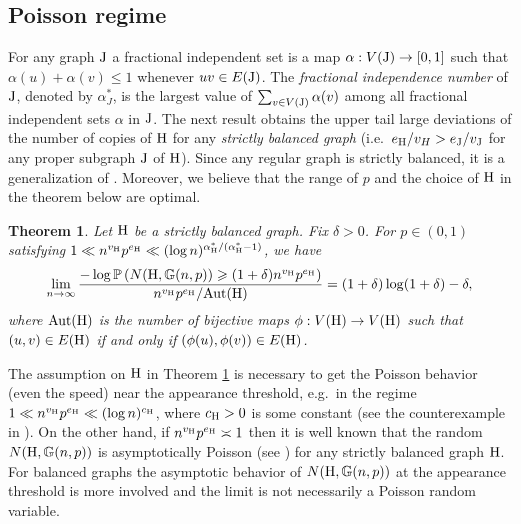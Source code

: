 \documentclass[a4paper,11pt,english,reqno]{amsart}
\numberwithin{equation}{section}
\renewcommand{\leq}{\leqslant}
\renewcommand{\geq}{\geqslant}
\newcommand{\uH}{\textup{H}}
\renewcommand{\P}{\mathbb{P}}
\newcommand{\G}{\mathbb{G}}
\newcommand{\tu}[1]{\textup{#1}}
\newtheorem{theorem}{Theorem}[section]
\begin{document}
	\subsection{Poisson regime} For any graph $\tu{J}$ %
	a fractional independent set is a map $\alpha:V(\tu{J})\rightarrow [0,1]$ such that $\alpha(u)+\alpha(v)\leq 1$ whenever $uv\in E(\tu{J})$. The {\em fractional independence number} of $\tu{J}$, denoted by $\alpha^{*}_{J}$, is the largest value of $\sum_{v\in V(\tu{J})}\alpha(v)$ among all fractional independent sets $\alpha$ in $\tu{J}$.
	The next result obtains the upper tail large deviations of the number of copies of $\uH$ for any {{\em strictly balanced graph}} (i.e.~$e_{\uH}/v_{H} > e_{\tu{J}}/v_{\tu{J}}$ for any proper subgraph $\tu{J}$ of $\uH$). Since any regular graph is strictly balanced, it is a  generalization of \cite[Theorem 1.6]{HMS}. %
	Moreover, we believe that the range of $p$ and the choice of $\uH$ in the theorem below are optimal.
	\begin{theorem}\label{thm:poi}
		Let $\uH$ be a strictly balanced graph. %
		Fix $\delta>0$. For $p\in (0,1)$ satisfying $1 \ll n^{v_{\uH}}p^{e_{\uH}}\ll (\log n)^{\alpha^{*}_{\uH}/\left(\alpha^{*}_{\uH}-1\right)}$, we have
		\begin{equation*}
			\lim_{n\rightarrow \infty} \frac{-\log \P\left(N(\uH, \G(n,p))\geq (1+\delta)n^{v_{\uH}}p^{e_{\uH}}\right)}{ n^{v_{\uH}}p^{e_{\uH}}/ \tu{Aut}({\uH})} = (1+\delta)\log(1+\delta)-\delta,
		\end{equation*}
		where $\tu{Aut}(\uH)$ is the number of bijective maps $\phi: V(\uH)\rightarrow V(\uH)$ such that $(u,v)\in E(\uH)$ if and only if $(\phi(u), \phi(v))\in E(\uH)$.
	\end{theorem}
	
	
	The assumption on $\uH$ in Theorem \ref{thm:poi} is necessary to get the Poisson behavior (even the speed) near the appearance threshold, e.g.~in the regime $1 \ll n^{v_\uH} p^{e_\uH} \ll (\log n)^{c_\uH}$, where $c_\uH >0$ is some constant (see the counterexample  in \cite[Theorem 1]{counterexample}). On the other hand, if $n^{v_\uH} p^{e_\uH} \asymp 1$ then it is well known that the random $N(\uH,\G(n,p))$ is asymptotically Poisson (see \cite[Theorem 1]{KR83}) for any strictly balanced graph $\uH$. For balanced graphs the asymptotic behavior of $N(\uH, \G(n,p))$ at the appearance threshold is more involved and the limit is not necessarily a Poisson random variable.
	
\end{document}
